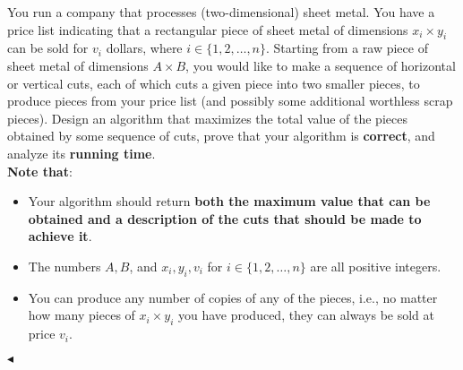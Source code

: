 \documentclass[11pt]{article}
\newenvironment{problem}[2][Problem]{\begin{trivlist}
\item[\hskip \labelsep{\bfseries#1}\hskip\labelsep{\bfseries#2.}]}{\hfill$\blacktriangleleft$\end{trivlist}}
\begin{document}
\begin{problem}{2 (Processing Sheet Metal)}
    You run a company that processes (two-dimensional) sheet metal. 
    You have a price list indicating that a rectangular piece of 
    sheet metal of dimensions $x_i \times y_i$ can be sold for 
    $v_i$ dollars, where $i \in \{1, 2, \dots , n\}$. Starting 
    from a raw piece of sheet metal of dimensions $A \times B$, 
    you would like to make a sequence of horizontal or vertical 
    cuts, each of which cuts a given piece into two smaller 
    pieces, to produce pieces from your price list (and possibly 
    some additional worthless scrap pieces). Design an algorithm 
    that maximizes the total value of the pieces obtained by 
    some sequence of cuts, prove that your algorithm is \textbf{correct}, 
    and analyze its \textbf{running time}. \\
    \textbf{Note that}:
    \begin{itemize}
        \item Your algorithm should return \textbf{both the maximum value that can be obtained and a description of the cuts that should be made to achieve it}.
        \item The numbers $A,B$, and $x_i,y_i,v_i$ for $i \in \{1,2,\dots,n\}$ are all positive integers.
        \item You can produce any number of copies of any of the pieces, i.e., no matter how many pieces of $x_i \times y_i$
        you have produced, they can always be sold at price $v_i$.
    \end{itemize}
\end{problem}
\end{document}
